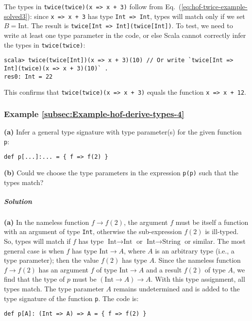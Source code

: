 The types in \lstinline!twice(twice)(x => x + 3)! follow from Eq.~(\ref{eq:hof-twice-example-solved3}):
since \lstinline!x => x + 3! has type \lstinline!Int => Int!, types
will match only if we set $B=\text{Int}$. The result is \lstinline!twice[Int => Int](twice[Int])!.
To test, we need to write at least one type parameter in the code,
or else Scala cannot correctly infer the types in \lstinline!twice(twice)!:
\begin{lstlisting}
scala> twice(twice[Int])(x => x + 3)(10) // Or write `twice[Int => Int](twice)(x => x + 3)(10)` .
res0: Int = 22
\end{lstlisting}
This confirms that \lstinline!twice(twice)(x => x + 3)! equals the
function \lstinline!x => x + 12!.

\subsubsection{Example \label{subsec:Example-hof-derive-types-4}\ref{subsec:Example-hof-derive-types-4}}

\textbf{(a)} Infer a general type signature with type parameter(s)
for the given function \lstinline!p!:
\begin{lstlisting}
def p[...]:... = { f => f(2) }
\end{lstlisting}
\textbf{(b)} Could we choose the type parameters in the expression
\lstinline!p(p)! such that the types match?

\subparagraph{Solution}

\textbf{(a)} In the nameless function $f\rightarrow f(2)$, the argument
$f$ must be itself a function with an argument of type \lstinline!Int!,
otherwise the sub-expression $f(2)$ is ill-typed. So, types will
match if $f$ has type $\text{Int}\rightarrow\text{Int}$ or $\text{Int}\rightarrow\text{String}$
or similar. The most general case is when $f$ has type $\text{Int}\rightarrow A$,
where $A$ is an arbitrary type (i.e., a type parameter); then the
value $f(2)$ has type $A$. Since the nameless function $f\rightarrow f(2)$
has an argument $f$ of type $\text{Int}\rightarrow A$ and a result
$f(2)$ of type $A$, we find that the type of $p$ must be $\left(\text{Int}\rightarrow A\right)\rightarrow A$.
With this type assignment, all types match. The type parameter $A$
remains undetermined and is added to the type signature of the function
\lstinline!p!. The code is:
\begin{lstlisting}
def p[A]: (Int => A) => A = { f => f(2) }
\end{lstlisting}

